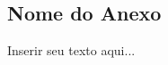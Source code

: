 %
%

\begin{anexosenv}
\partanexos

\chapter{Nome do Anexo}
\label{chap:anexox}

Inserir seu texto aqui...


\end{anexosenv}
